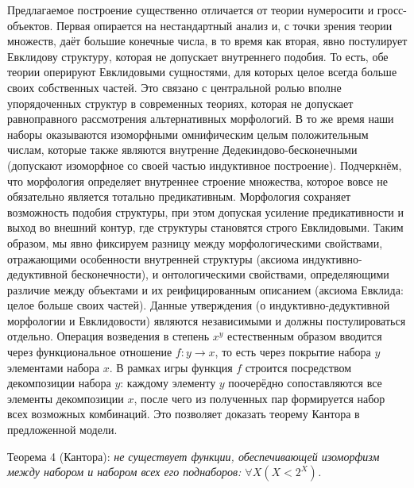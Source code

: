 \documentclass[12pt]{article}
\begin{document}
Предлагаемое построение существенно отличается от теории нумеросити и гросс-объектов. Первая опирается на нестандартный анализ и, с точки зрения теории множеств, даёт большие конечные числа, в то время как вторая, явно постулирует Евклидову структуру, которая не допускает внутреннего подобия. То есть, обе теории оперируют Евклидовыми сущностями, для которых целое всегда больше своих собственных частей. Это связано с центральной ролью вполне упорядоченных структур в современных теориях, которая не допускает равноправного рассмотрения альтернативных морфологий. В то же время наши наборы оказываются изоморфными омнифическим целым положительным числам, которые также являются внутренне Дедекиндово-бесконечными (допускают изоморфное со своей частью индуктивное построение). Подчеркнём, что морфология определяет внутреннее строение множества, которое вовсе не обязательно является тотально предикативным. Морфология сохраняет возможность подобия структуры, при этом допуская усиление предикативности и выход во внешний контур, где структуры становятся строго Евклидовыми. Таким образом, мы явно фиксируем разницу между морфологическими свойствами, отражающими особенности внутренней структуры (аксиома индуктивно-дедуктивной бесконечности), и онтологическими свойствами, определяющими различие между объектами и их реифицированным описанием (аксиома Евклида: целое больше своих частей). Данные утверждения (о индуктивно-дедуктивной морфологии и Евклидовости) являются независимыми и должны постулироваться отдельно. Операция возведения в степень $x^y$ естественным образом вводится через функциональное отношение $f : y \to x$, то есть через покрытие набора $y$ элементами набора $x$. В рамках игры функция $f$ строится посредством декомпозиции набора $y$: каждому элементу $y$ поочерёдно сопоставляются все элементы декомпозиции $x$, после чего из полученных пар формируется набор всех возможных комбинаций. Это позволяет доказать теорему Кантора в предложенной модели.

Теорема 4 (Кантора): {\it не существует функции, обеспечивающей изоморфизм между набором и набором всех его поднаборов: $\forall X (X < 2^X)$.}
\end{document}
